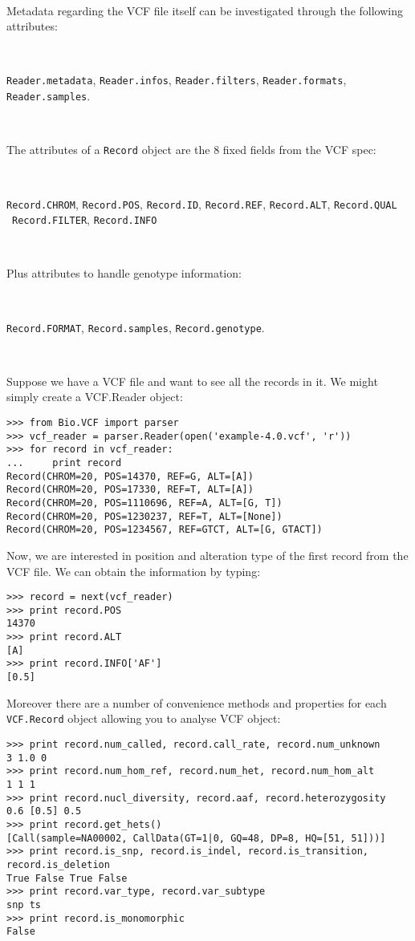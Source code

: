 \
\



\noindent Metadata regarding the VCF file itself can be investigated through the following attributes:

\

\verb|Reader.metadata|, \verb|Reader.infos|, \verb|Reader.filters|, \verb|Reader.formats|, \verb|Reader.samples|.

\

\noindent The attributes of a \verb|Record| object are the 8 fixed fields from the VCF spec: \

\

\verb|Record.CHROM|, \verb|Record.POS|, \verb|Record.ID|, \verb|Record.REF|, \verb|Record.ALT|, \verb|Record.QUAL| \
  \verb|Record.FILTER|, \verb|Record.INFO|

\

\noindent Plus attributes to handle genotype information:

\

\verb|Record.FORMAT|, \verb|Record.samples|, \verb|Record.genotype|.

\

\noindent Suppose we have a VCF file and want to see all the records in it. We might simply create a VCF.Reader object:

\begin{verbatim}
>>> from Bio.VCF import parser
>>> vcf_reader = parser.Reader(open('example-4.0.vcf', 'r'))
>>> for record in vcf_reader:
...     print record
Record(CHROM=20, POS=14370, REF=G, ALT=[A])
Record(CHROM=20, POS=17330, REF=T, ALT=[A])
Record(CHROM=20, POS=1110696, REF=A, ALT=[G, T])
Record(CHROM=20, POS=1230237, REF=T, ALT=[None])
Record(CHROM=20, POS=1234567, REF=GTCT, ALT=[G, GTACT])
\end{verbatim}


\noindent Now, we are interested in position and alteration type of the first record from the VCF file. We can obtain the information by typing:

\begin{verbatim}
>>> record = next(vcf_reader)
>>> print record.POS
14370
>>> print record.ALT
[A]
>>> print record.INFO['AF']
[0.5]
\end{verbatim}

\noindent Moreover there are a number of convenience methods and properties for each \verb|VCF.Record| object allowing you to analyse VCF object:

\begin{verbatim}
>>> print record.num_called, record.call_rate, record.num_unknown
3 1.0 0
>>> print record.num_hom_ref, record.num_het, record.num_hom_alt
1 1 1
>>> print record.nucl_diversity, record.aaf, record.heterozygosity
0.6 [0.5] 0.5
>>> print record.get_hets()
[Call(sample=NA00002, CallData(GT=1|0, GQ=48, DP=8, HQ=[51, 51]))]
>>> print record.is_snp, record.is_indel, record.is_transition, record.is_deletion
True False True False
>>> print record.var_type, record.var_subtype
snp ts
>>> print record.is_monomorphic
False
\end{verbatim}

